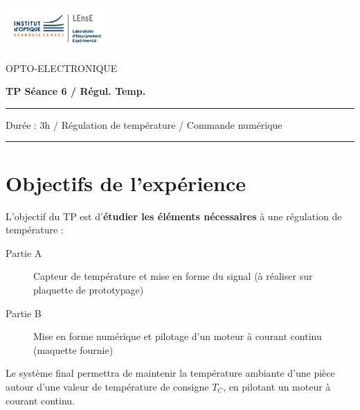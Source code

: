 \documentclass[a4paper,11pt]{article}
\begin{document}
\newpage

\begin{minipage}[c]{.25\linewidth}
	\includegraphics[width=4cm]{images/LEnsE_IOGS.jpg}
\end{minipage} \hfill
\begin{minipage}[c]{.4\linewidth}

\begin{center}
\vspace{0.3cm}
{\Large OPTO-ELECTRONIQUE}

\medskip

\textbf{\Large TP Séance 6 / Régul. Temp.}

\end{center}
\end{minipage}\hfill

\begin{center}
\vspace{0.3cm}

\noindent \rule{\linewidth}{1pt}

Durée : 3h / Régulation de température / Commande numérique

\vspace{-0.2cm}
\noindent \rule{\linewidth}{1pt}
\end{center}

\section*{Objectifs de l'expérience}

L'objectif du TP est d'\textbf{étudier les éléments nécessaires} à une régulation de température :

\begin{description}
	\item[Partie A] Capteur de température et mise en forme du signal (à réaliser sur plaquette de prototypage)
	\item[Partie B] Mise en forme numérique et pilotage d'un moteur à courant continu (maquette fournie)
\end{description}

Le système final permettra de maintenir la température ambiante d'une pièce autour d'une valeur de température de consigne $T_C$, en pilotant un moteur à courant continu. 
\end{document}
